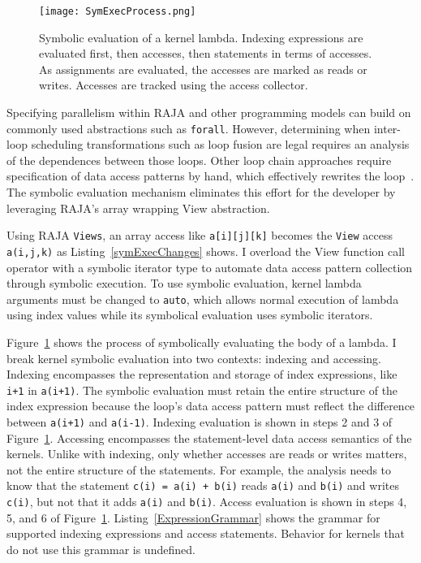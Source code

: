 \begin{figure}
\texttt{[image: SymExecProcess.png]}
\caption{Symbolic evaluation of a kernel lambda. 
Indexing expressions are evaluated first, then accesses, then statements in terms of accesses.
As assignments are evaluated, the accesses are marked as reads or writes.
Accesses are tracked using the access collector.}\label{symExec}
\end{figure}
Specifying parallelism within RAJA and other programming models can
build on commonly used abstractions such as \verb.forall..
However, determining when inter-loop scheduling transformations such as
loop fusion are legal requires an analysis of the dependences between those loops.
Other loop chain approaches require specification of data access patterns by
hand, which effectively rewrites the loop~\cite{bertolacci2019using}.
The symbolic evaluation mechanism eliminates this effort for the
developer by leveraging RAJA's array wrapping View abstraction.

Using RAJA \verb.Views.,
an array access like \verb.a[i][j][k]. becomes the \verb.View. access \verb.a(i,j,k). as
Listing~\ref{symExecChanges} shows.
I overload the View function call operator with a symbolic iterator type to automate
data access pattern collection through symbolic execution.
To use symbolic evaluation, kernel lambda arguments must be changed to
\verb.auto., which allows normal execution of lambda using index values while
its symbolical evaluation uses symbolic iterators.

Figure~\ref{symExec} shows the process of symbolically evaluating the body of a lambda. 
I break kernel symbolic evaluation into two contexts: indexing and accessing. 
Indexing encompasses the representation and storage of index expressions, like
\verb.i+1. in \verb.a(i+1)..
The symbolic evaluation must retain the entire structure of the index expression 
because the loop's
data access pattern must reflect the difference between \verb.a(i+1). and
\verb.a(i-1)..
Indexing evaluation is shown in steps 2 and 3 of Figure~\ref{symExec}.
Accessing encompasses the statement-level data access semantics of the kernels.
Unlike with indexing, only whether accesses are reads or writes matters,
not the entire structure of the statements.
For example, the analysis needs to know that the statement \verb.c(i) = a(i) + b(i).
reads \verb.a(i). and \verb.b(i). and writes \verb.c(i)., but not that it
adds \verb.a(i). and \verb.b(i)..
Access evaluation is shown in steps 4, 5, and 6 of Figure~\ref{symExec}.
Listing~\ref{ExpressionGrammar} shows the grammar for supported indexing expressions and access statements. 
Behavior for kernels that do not use this grammar is undefined.

